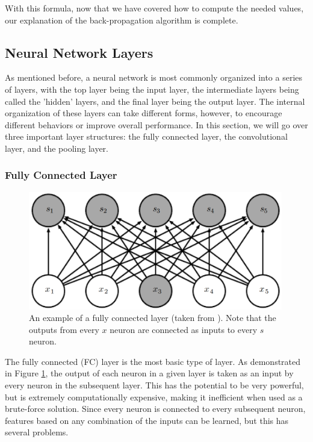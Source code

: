 \documentclass[11pt,a4paper,oldfontcommands]{memoir}
\begin{document}
With this formula, now that we have covered how to compute the needed values, our explanation of the back-propagation algorithm is complete.

\subsection{Neural Network Layers}
As mentioned before, a neural network is most commonly organized into a series of layers, with the top layer being the input layer, the intermediate layers being called the 'hidden' layers, and the final layer being the output layer. The internal organization of these layers can take different forms, however, to encourage different behaviors or improve overall performance. In this section, we will go over three important layer structures: the fully connected layer, the convolutional layer, and the pooling layer.

\subsubsection{Fully Connected Layer}

\begin{figure}
    \centering
    \includegraphics[width=30em]{Images/FC_layer.PNG}
    \caption{An example of a fully connected layer (taken from \cite{dl_book}). Note that the outputs from every $x$ neuron are connected as inputs to every $s$ neuron.}
    \label{fig:fc_layer}
\end{figure}

The fully connected (FC) layer is the most basic type of layer. As demonstrated in Figure \ref{fig:fc_layer}, the output of each neuron in a given layer is taken as an input by every neuron in the subsequent layer. This has the potential to be very powerful, but is extremely computationally expensive, making it inefficient when used as a brute-force solution. Since every neuron is connected to every subsequent neuron, features based on any combination of the inputs can be learned, but this has several problems. 
\end{document}
